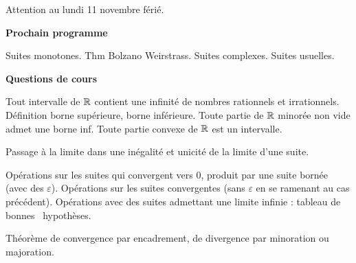 





Attention au lundi 11 novembre férié.




\bigskip
\begin{center}
 \textbf{Prochain programme}
\end{center}
Suites monotones. Thm Bolzano Weirstrass. Suites complexes. Suites usuelles.

\begin{center}
 \textbf{Questions de cours}
\end{center}
Tout intervalle de $\mathbb{R}$ contient une infinité de nombres rationnels et irrationnels. Définition borne supérieure, borne inférieure. Toute partie de $\mathbb{R}$ minorée non vide admet une borne inf. Toute partie convexe de $\mathbb{R}$ est un intervalle.

Passage à la limite dans une inégalité et unicité de la limite d'une suite.

Opérations sur les suites qui convergent vers $0$, produit par une suite bornée (avec des $\varepsilon$). Opérations sur les suites convergentes (sans $\varepsilon$ en se ramenant au cas précédent). Opérations avec des suites admettant une limite infinie : tableau de \og bonnes\fg~ hypothèses.

Théorème de convergence par encadrement, de divergence par minoration ou majoration.

